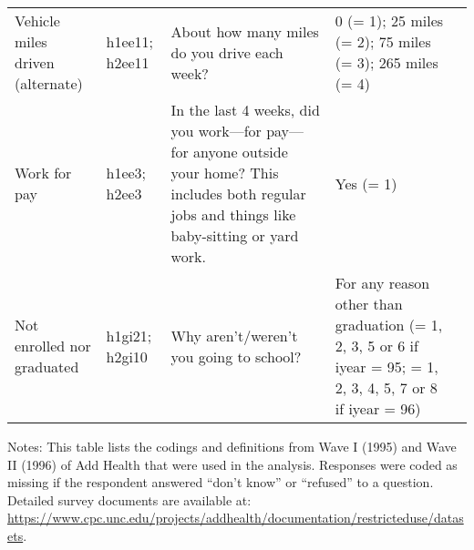 \documentclass[letterpaper,12pt]{article}
\newcommand\Tstrut{\rule{0pt}{2.6ex}}         %
\begin{document}
\begin{longtable}{P{.25\linewidth} P{.15\linewidth} P{.25\linewidth} P{.25\linewidth} P{.3\linewidth}}
Vehicle miles driven (alternate) & 
h1ee11; h2ee11 &
About how many miles do you drive each week? &
0 (= 1); 25 miles (= 2); 75 miles (= 3); 265 miles (= 4)  \Tstrut\\

Work for pay & 
h1ee3; h2ee3 &
In the last 4 weeks, did you work---for pay---for anyone outside your home? This includes both regular jobs and things like baby-sitting or yard work. &
Yes (= 1) \Tstrut\\

Not enrolled nor graduated & 
h1gi21; h2gi10 &
Why aren't/weren't you going to school? &
For any reason other than graduation (= 1, 2, 3, 5 or 6 if iyear = 95; = 1, 2, 3, 4, 5, 7 or 8 if iyear = 96) \Tstrut\\

\end{longtable}
\begin{flushleft}
\scriptsize Notes: This table lists the codings and definitions from Wave I (1995) and Wave II (1996) of Add Health that were used in the analysis. Responses were coded as missing if the respondent answered ``don't know'' or ``refused'' to a question. Detailed survey documents are available at: \mbox{\url{https://www.cpc.unc.edu/projects/addhealth/documentation/restricteduse/datasets}}.
\end{flushleft}

\end{document}
